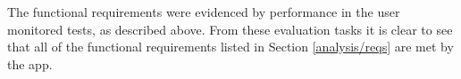 \documentclass{l4proj}
\begin{document}
The functional requirements were evidenced by performance in the user monitored tests, as described above. From these evaluation tasks it is clear to see that all of the functional requirements listed in Section \ref{analysis/reqs} are met by the app. 


    
\end{document}
